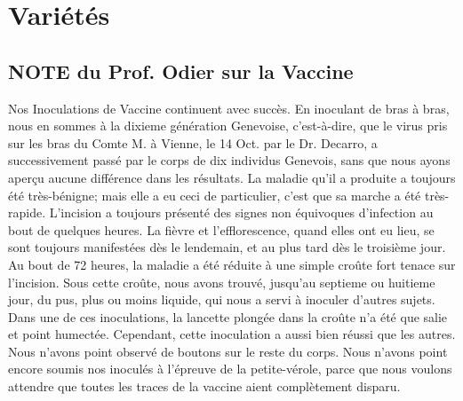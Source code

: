 \setcounter{page}{315}
\chapter{Variétés}
\section{NOTE du Prof. Odier sur la Vaccine}
Nos Inoculations de Vaccine continuent avec succès. En inoculant de bras à bras, nous en sommes à la dixieme génération Genevoise, c'est-à-dire, que le virus pris sur les bras du Comte M. à Vienne, le 14 Oct. par le Dr. Decarro, a successivement passé par le corps de dix individus Genevois, sans que nous ayons aperçu aucune différence dans les résultats. La maladie qu'il a produite a toujours été très-bénigne; mais elle a eu ceci de particulier, c'est que sa marche a été très-rapide. L'incision a toujours présenté des signes non équivoques d'infection au bout de quelques heures. La fièvre et l'efflorescence, quand elles ont eu lieu, se sont toujours manifestées dès le lendemain, et au plus tard dès le troisième jour. Au bout de 72 heures, la maladie a été réduite à une simple croûte fort tenace sur l'incision. Sous cette croûte, nous avons trouvé, jusqu'au septieme ou huitieme\setcounter{page}{316} jour, du pus, plus ou moins liquide, qui nous a servi à inoculer d'autres sujets. Dans une de ces inoculations, la lancette plongée dans la croûte n'a été que salie et point humectée. Cependant, cette inoculation a aussi bien réussi que les autres. Nous n'avons point observé de boutons sur le reste du corps. Nous n'avons point encore soumis nos inoculés à l'épreuve de la petite-vérole, parce que nous voulons attendre que toutes les traces de la vaccine aient complètement disparu.
